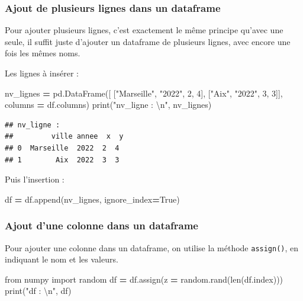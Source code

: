 \documentclass[12pt,]{book}
\newenvironment{Shaded}{\begin{snugshade}}{\end{snugshade}}
\newcommand{\DecValTok}[1]{\textcolor[rgb]{0.00,0.00,0.81}{#1}}
\newcommand{\CharTok}[1]{\textcolor[rgb]{0.31,0.60,0.02}{#1}}
\newcommand{\StringTok}[1]{\textcolor[rgb]{0.31,0.60,0.02}{#1}}
\newcommand{\ImportTok}[1]{#1}
\newcommand{\VariableTok}[1]{\textcolor[rgb]{0.00,0.00,0.00}{#1}}
\newcommand{\OperatorTok}[1]{\textcolor[rgb]{0.81,0.36,0.00}{\textbf{#1}}}
\newcommand{\BuiltInTok}[1]{#1}
\newcommand{\NormalTok}[1]{#1}
\numberwithin{equation}{section}
\numberwithin{countremarque}{section}
\begin{document}
\subsubsection{Ajout de plusieurs lignes dans un
dataframe}\label{ajout-de-plusieurs-lignes-dans-un-dataframe}

Pour ajouter plusieurs lignes, c'est exactement le même principe qu'avec
une seule, il suffit juste d'ajouter un dataframe de plusieurs lignes,
avec encore une fois les mêmes noms.

Les lignes à insérer :

\begin{Shaded}
\begin{Highlighting}[]
\NormalTok{nv_lignes }\OperatorTok{=}\NormalTok{ pd.DataFrame([}
\NormalTok{    [}\StringTok{"Marseille"}\NormalTok{, }\StringTok{"2022"}\NormalTok{, }\DecValTok{2}\NormalTok{, }\DecValTok{4}\NormalTok{],}
\NormalTok{    [}\StringTok{"Aix"}\NormalTok{, }\StringTok{"2022"}\NormalTok{, }\DecValTok{3}\NormalTok{, }\DecValTok{3}\NormalTok{]],}
\NormalTok{    columns }\OperatorTok{=}\NormalTok{ df.columns)}
\BuiltInTok{print}\NormalTok{(}\StringTok{"nv_ligne : }\CharTok{\textbackslash{}n}\StringTok{"}\NormalTok{, nv_lignes)}
\end{Highlighting}
\end{Shaded}

\begin{lstlisting}
## nv_ligne : 
##         ville annee  x  y
## 0  Marseille  2022  2  4
## 1        Aix  2022  3  3
\end{lstlisting}

Puis l'insertion :

\begin{Shaded}
\begin{Highlighting}[]
\NormalTok{df }\OperatorTok{=}\NormalTok{ df.append(nv_lignes, ignore_index}\OperatorTok{=}\VariableTok{True}\NormalTok{)}
\end{Highlighting}
\end{Shaded}

\subsubsection{Ajout d'une colonne dans un
dataframe}\label{ajout-dune-colonne-dans-un-dataframe}

Pour ajouter une colonne dans un dataframe, on utilise la méthode
\texttt{assign()}, en indiquant le nom et les valeurs.

\begin{Shaded}
\begin{Highlighting}[]
\ImportTok{from}\NormalTok{ numpy }\ImportTok{import}\NormalTok{ random}
\NormalTok{df }\OperatorTok{=}\NormalTok{ df.assign(z }\OperatorTok{=}\NormalTok{ random.rand(}\BuiltInTok{len}\NormalTok{(df.index)))}
\BuiltInTok{print}\NormalTok{(}\StringTok{"df : }\CharTok{\textbackslash{}n}\StringTok{"}\NormalTok{, df)}
\end{Highlighting}
\end{Shaded}
\end{document}
